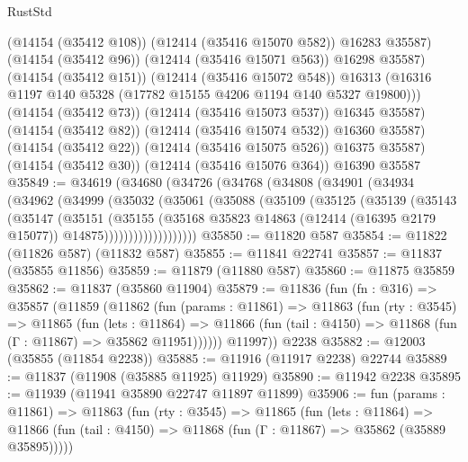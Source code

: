 \begin{lexlean}{RustStd}
\begin{coremodule}
{\begin{coremodule}
{{{{{{{{{{{{{{{{{{{{{{{{{{{{{{{{{{{{{{{{{{{{{{{{{{                (@14154 (@35412 @108))
                (@12414 (@35416 @15070 @582))
                @16283
                @35587)
              (@14154 (@35412 @96))
              (@12414 (@35416 @15071 @563))
              @16298
              @35587)
            (@14154 (@35412 @151))
            (@12414 (@35416 @15072 @548))
            @16313
            (@16316 @1197 @140 @5328 (@17782 @15155 @4206 @1194 @140 @5327 @19800)))
          (@14154 (@35412 @73))
          (@12414 (@35416 @15073 @537))
          @16345
          @35587)
        (@14154 (@35412 @82))
        (@12414 (@35416 @15074 @532))
        @16360
        @35587)
      (@14154 (@35412 @22))
      (@12414 (@35416 @15075 @526))
      @16375
      @35587)
    (@14154 (@35412 @30))
    (@12414 (@35416 @15076 @364))
    @16390
    @35587
@35849 := @34619
    (@34680
      (@34726
        (@34768
          (@34808
            (@34901
              (@34934
                (@34962
                  (@34999
                    (@35032
                      (@35061
                        (@35088
                          (@35109
                            (@35125
                              (@35139
                                (@35143
                                  (@35147
                                    (@35151
                                      (@35155
                                        (@35168
                                          @35823
                                          @14863
                                          (@12414 (@16395 @2179 @15077))
                                          @14875)))))))))))))))))))
@35850 := @11820 @587
@35854 := @11822 (@11826 @587) (@11832 @587)
@35855 := @11841 @22741
@35857 := @11837 (@35855 @11856)
@35859 := @11879 (@11880 @587)
@35860 := @11875 @35859
@35862 := @11837 (@35860 @11904)
@35879 := @11836
    (fun (fn : @316) =>
    @35857
      (@11859
        (@11862
          (fun (params : @11861) =>
          @11863
            (fun (rty : @3545) =>
            @11865
              (fun (lets : @11864) =>
              @11866 (fun (tail : @4150) => @11868 (fun (Γ : @11867) => @35862 @11951))))))
        @11997))
    @2238
@35882 := @12003 (@35855 (@11854 @2238))
@35885 := @11916 (@11917 @2238) @22744
@35889 := @11837 (@11908 (@35885 @11925) @11929)
@35890 := @11942 @2238
@35895 := @11939 (@11941 @35890 @22747 @11897 @11899)
@35906 := fun (params : @11861) =>
  @11863
    (fun (rty : @3545) =>
    @11865
      (fun (lets : @11864) =>
      @11866 (fun (tail : @4150) => @11868 (fun (Γ : @11867) => @35862 (@35889 @35895)))))
}}}}}}}}}}}}}}}}}}}}}}}}}}}}}}}}}}}}}}}}}}}}}}}}}}
\end{coremodule}}
\end{coremodule}
\end{lexlean}
